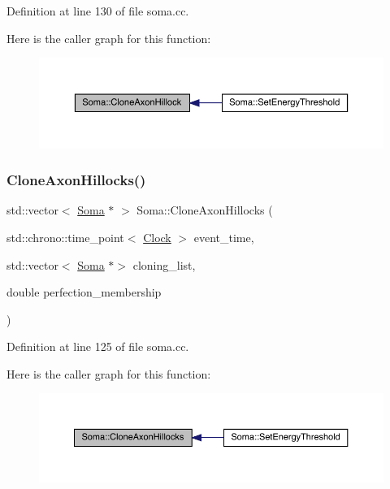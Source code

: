 Definition at line 130 of file soma.\+cc.

Here is the caller graph for this function\+:
\nopagebreak
\begin{figure}[H]
\begin{center}
\leavevmode
\includegraphics[width=350pt]{class_soma_a31463fba2f535e9c7cb05c8622fe3562_icgraph}
\end{center}
\end{figure}
\mbox{\label{class_soma_a299c95b89f50576244d1e56f531a80be}} 
\subsubsection{\texorpdfstring{Clone\+Axon\+Hillocks()}{CloneAxonHillocks()}}
{\footnotesize\ttfamily std\+::vector$<$ \hyperlink{class_soma}{Soma} $\ast$ $>$ Soma\+::\+Clone\+Axon\+Hillocks (\begin{DoxyParamCaption}\item[{std\+::chrono\+::time\+\_\+point$<$ \hyperlink{universe_8h_a0ef8d951d1ca5ab3cfaf7ab4c7a6fd80}{Clock} $>$}]{event\+\_\+time,  }\item[{std\+::vector$<$ \hyperlink{class_soma}{Soma} $\ast$$>$}]{cloning\+\_\+list,  }\item[{double}]{perfection\+\_\+membership }\end{DoxyParamCaption})}



Definition at line 125 of file soma.\+cc.

Here is the caller graph for this function\+:
\nopagebreak
\begin{figure}[H]
\begin{center}
\leavevmode
\includegraphics[width=350pt]{class_soma_a299c95b89f50576244d1e56f531a80be_icgraph}
\end{center}
\end{figure}
\mbox{\label{class_soma_ad51c97b76dd7a1f77dc987ae33fd89bc}} 
